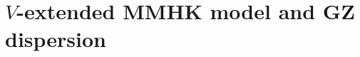 \documentclass[aps,prl,reprint,superscriptaddress,nofootinbib,longbibliography]{revtex4-1}
\newcommand{\tp}{t'}
\newcommand{\epsk}{\varepsilon_{\mathrm{NN}}(\mathbf{k})}
\newcommand{\wzero}{\omega_{\mathrm{GZ}}}
\begin{document}

\section{$V$-extended MMHK model and GZ dispersion}
\end{document}
